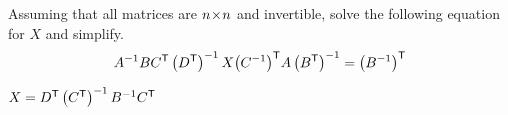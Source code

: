 
\begin{Exercise}[
name={},
title={}, 
difficulty=0,
origin={\cite{OV}}]
Assuming that all matrices are $n \! \times \! n$ and invertible, solve the following equation for $X$ and simplify.
\[
A^{-1}B{{C}^{\mathsf{T}}}\left({{D}^{\mathsf{T}}}\right)^{-1}X{{\left(C^{-1}\right)}^{\mathsf{T}}}A\left({{B}^{\mathsf{T}}}\right)^{-1}={{\left(B^{-1}\right)}^{\mathsf{T}}}
\]
\end{Exercise}

\begin{Answer}
$X={{D}^{\mathsf{T}}}\left({{C}^{\mathsf{T}}}\right)^{-1}B^{-1}{{C}^{\mathsf{T}}}$
\end{Answer}
